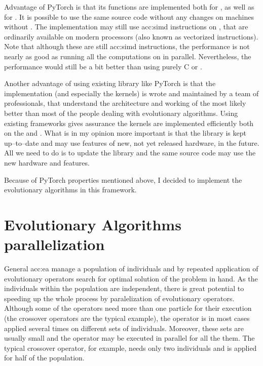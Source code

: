 Advantage of PyTorch is that its functions are implemented both for \cpuns, as well as for \gpuns. It is possible to use the same source code without any changes on machines without \gpuns. The implementation may still use \acrshort{acc:simd} instructions on \cpuns, that are ordinarily available on modern processors (also known as vectorized instructions). Note that although these are still \acrshort{acc:simd} instructions, the performance is not nearly as good as running all the computations on \gpu in parallel. Nevertheless, the performance would still be a bit better than using purely C or \cppns.

Another advantage of using existing library like PyTorch is that the implementation (and especially the \cuda kernels) is wrote and maintained by a team of professionals, that understand the architecture and working of the \gpu most likely better than most of the people dealing with evolutionary algorithms. Using existing frameworks gives assurance the kernels are implemented efficiently both on the \gpu and \cpuns. What is in my opinion more important is that the library is kept up--to--date and may use features of new, not yet released hardware, in the future. All we need to do is to update the library and the same source code may use the new hardware and features.

Because of PyTorch properties mentioned above, I decided to implement the evolutionary algorithms in this framework.




\section{Evolutionary Algorithms parallelization}

General \acrlong{acc:ea} manage a population of individuals and by repeated application of evolutionary operators search for optimal solution of the problem in hand. As the individuals within the population are independent, there is great potential to speeding up the whole process by paralelization of evolutionary operators. Although some of the operators need more than one particle for their execution (the crossover operators are the typical example), the operator is in most cases applied several times on different sets of individuals. Moreover, these sets are usually small and the operator may be executed in parallel for all the them. The typical crossover operator, for example, needs only two individuals and is applied for half of the population.

